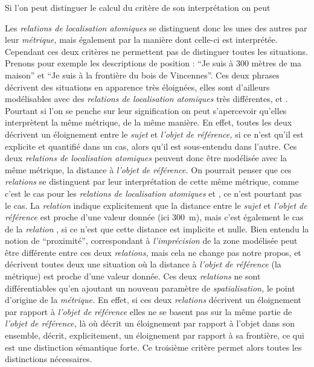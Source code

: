 %
Si l'on peut distinguer le calcul du critère de son interprétation on peut

Les \emph{relations de localisation atomiques} se distinguent donc les unes des autres par leur \emph{métrique,} mais également par la manière dont celle-ci est interprétée. Cependant ces deux critères ne permettent pas de distinguer toutes les situations. Prenons pour exemple les descriptions de position : \enquote{Je suis à 300 mètres de ma maison} et \enquote{Je suis à la frontière du bois de Vincennes}. Ces deux phrases décrivent des situations en apparence très éloignées, elles sont d'ailleurs modélisables avec des \emph{relations de localisation atomiques} très différentes,  et . Pourtant si l'on se penche sur leur signification on peut s’apercevoir qu'elles interprètent la même métrique, de la même manière. En effet, toutes les deux décrivent un éloignement entre le \emph{sujet} et \emph{l'objet de référence,} si ce n'est qu'il est explicite et quantifié dans un cas, alors qu'il est sous-entendu dans l'autre. Ces deux \emph{relations de localisation atomiques} peuvent donc être modélisée avec la même métrique, la distance à \emph{l'objet de référence.} On pourrait penser que ces \emph{relations} se distinguent par leur interprétation de cette même métrique, comme c'est le cas pour les \emph{relations de localisation atomiques}  et , ce n'est pourtant pas le cas. La \emph{relation}  indique explicitement que la distance entre le \emph{sujet} et \emph{l'objet de référence} est proche d'une valeur donnée (ici \SI{300}{\meter}), mais c'est également le cas de la \emph{relation} , si ce n'est que cette distance est implicite et nulle. Bien entendu la notion de \enquote{proximité}, correspondant à \emph{l'imprécision} de la zone modélisée peut être différente entre ces deux \emph{relations,} mais cela ne change pas notre propos,  et  décrivent toutes deux une situation où la distance à \emph{l'objet de référence} (\ie la métrique) est proche d'une valeur donnée. Ces deux \emph{relations} ne sont différentiables qu'en ajoutant un nouveau paramètre de \emph{spatialisation,} le point d'origine de la \emph{métrique.} En effet, si ces deux \emph{relations} décrivent un éloignement par rapport à \emph{l'objet de référence} elles ne se basent pas sur la même partie de \emph{l'objet de référence,} là où  décrit un éloignement par rapport à l'objet dans son ensemble,  décrit, explicitement, un éloignement par rapport à sa frontière, ce qui est une distinction sémantique forte. Ce troisième critère permet alors toutes les distinctions nécessaires.

